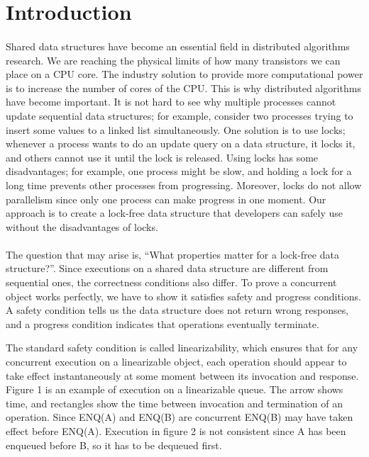 \documentclass[12pt]{article}
\begin{document}
\pagebreak

\section{Introduction}

\paragraph{}
Shared data structures have become an essential field in distributed algorithms research.
We are reaching the physical limits of how many transistors we can place on a CPU core. The industry solution to provide more computational power is to increase the number of cores of the CPU. This is why distributed algorithms have become important. It is not hard to see why multiple processes cannot update sequential data structures; for example, consider two processes trying to insert some values to a linked list simultaneously. One solution is to use locks; whenever a process wants to do an update query on a data structure, it locks it, and others cannot use it until the lock is released. Using locks has some disadvantages; for example, one process might be slow, and holding a lock for a long time prevents other processes from progressing. Moreover, locks do not allow parallelism since only one process can make progress in one moment. Our approach is to create a lock-free data structure that developers can safely use without the disadvantages of locks.

\paragraph{}
The question that may arise is, ``What properties matter for a lock-free data structure?''.
Since executions on a shared data structure are different from sequential ones, the correctness conditions also differ. To prove a concurrent object works perfectly, we have to show it satisfies safety and progress conditions. A safety condition tells us the data structure does not return wrong responses, and a progress condition indicates that operations eventually terminate.

The standard safety condition is called linearizability, which ensures that for any concurrent execution on a linearizable object, each operation should appear to take effect instantaneously at some moment between its invocation and response. Figure 1 is an example of execution on a linearizable queue. The arrow shows time, and rectangles show the time between invocation and termination of an operation. Since ENQ(A) and ENQ(B) are concurrent ENQ(B) may have taken effect before ENQ(A). Execution in figure 2 is not consistent since A has been enqueued before B, so it has to be dequeued first.
\end{document}
